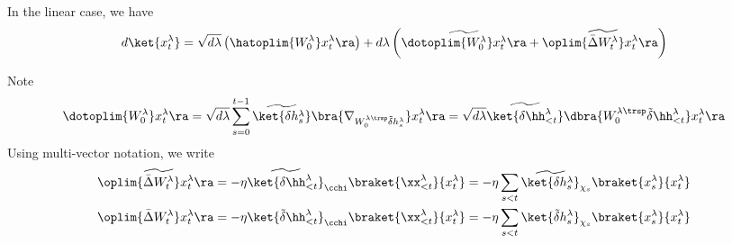 In the linear case, we have
\[
d\ket{x_{t}^{\lambda}}=\sqrt{d\lambda}\left(\hatoplim{W_{0}^{\lambda}}x_{t}^{\lambda}\ra\right)+d\lambda\left(\widetilde{\dotoplim{W_{0}^{\lambda}}x_{t}^{\lambda}\ra}+\oplim{\widetilde{\bar{\Delta}W_{t}^{\lambda}}}x_{t}^{\lambda}\ra\right)
\]

Note
\[
\dotoplim{W_{0}^{\lambda}}x_{t}^{\lambda}\ra=\sqrt{d\lambda}\sum_{s=0}^{t-1}\widetilde{\ket{\delta h_{s}^{\lambda}}}\bra{\nabla_{W_{0}^{\lambda\trsp}\tilde\delta h_{s}^{\lambda}}}x_{t}^{\lambda}\ra=\sqrt{d\lambda}\widetilde{\ket{\delta\hh_{<t}^{\lambda}}}\dbra{W_{0}^{\lambda\trsp}\tilde\delta\hh_{<t}^{\lambda}}x_{t}^{\lambda}\ra
\]
Using multi-vector notation, we write
\begin{align*}
\oplim{\widetilde{\bar{\Delta}W_{t}^{\lambda}}}x_{t}^{\lambda}\ra & =-\eta\widetilde{\ket{\delta\hh_{<t}^{\lambda}}}_{\cchi}\braket{\xx_{<t}^{\lambda}}{x_{t}^{\lambda}} =-\eta \sum_{s<t} \widetilde{\ket{\delta h_{s}^{\lambda}}}_{\chi_s}\braket{x_{s}^{\lambda}}{x_{t}^{\lambda}}\\
\oplim{\bar{\Delta}W_{t}^{\lambda}}x_{t}^{\lambda}\ra & =-\eta\ket{\tilde\delta\hh_{<t}^{\lambda}}_{\cchi}\braket{\xx_{<t}^{\lambda}}{x_{t}^{\lambda}}  =-\eta \sum_{s<t} {\ket{\tilde\delta h_{s}^{\lambda}}}_{\chi_s}\braket{x_{s}^{\lambda}}{x_{t}^{\lambda}}
\end{align*}


